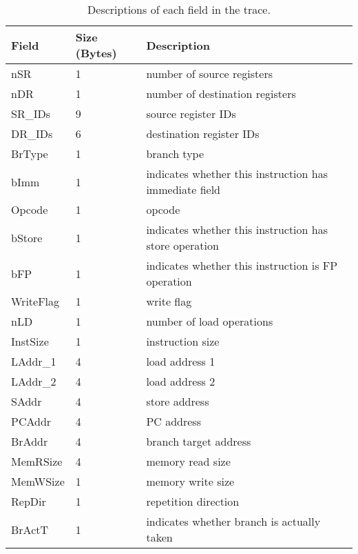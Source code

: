 \begin{table*}[htb]
\begin{footnotesize}
\begin{center}
\caption{Descriptions of each field in the trace.}
\label{table:trace_desc}
\begin{tabular}{|l|l|l|} 
\hline
Field     & Size (Bytes)       & Description \\ \hline 
nSR       & 1                  & number of source registers \\ \hline
nDR       & 1                  & number of destination registers \\ \hline
SR\_IDs   & 9                  & source register IDs \\ \hline
DR\_IDs   & 6                  & destination register IDs \\ \hline
BrType    & 1                  & branch type \\ \hline
bImm      & 1                  & indicates whether this instruction has immediate field \\ \hline
Opcode    & 1                  & opcode \\ \hline
bStore    & 1                  & indicates whether this instruction has store operation \\ \hline
bFP       & 1                  & indicates whether this instruction is FP operation \\ \hline
WriteFlag & 1                  & write flag \\ \hline
nLD       & 1                  & number of load operations \\ \hline
InstSize  & 1                  & instruction size \\ \hline
LAddr\_1  & 4                  & load address 1 \\ \hline
LAddr\_2  & 4                  & load address 2 \\ \hline
SAddr     & 4                  & store address \\ \hline
PCAddr    & 4                  & PC address \\ \hline
BrAddr    & 4                  & branch target address \\ \hline
MemRSize  & 4                  & memory read size \\ \hline
MemWSize  & 1                  & memory write size \\ \hline
RepDir    & 1                  & repetition direction  \\ \hline
BrActT    & 1                  & indicates whether branch is actually taken \\ \hline

\end{tabular}
\end{center}
\end{footnotesize}
\end{table*}

